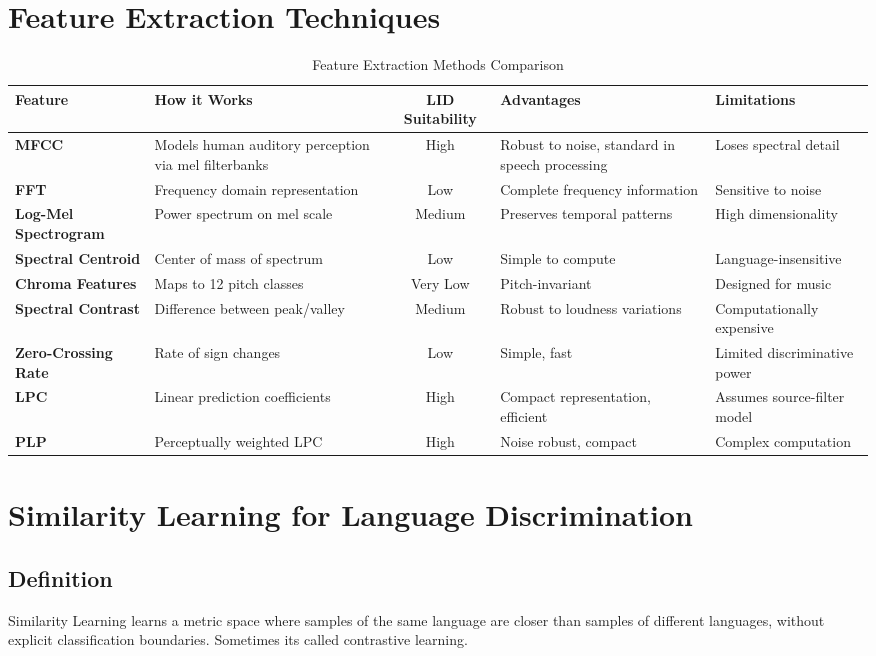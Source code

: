 \documentclass[12pt,a4paper]{article}
\begin{document}
	\section{Feature Extraction Techniques}
	
	\begin{table}[H]
		\centering
		\caption{Feature Extraction Methods Comparison}
		\begin{tabularx}{\textwidth}{lXcXX}
			\toprule
			\textbf{Feature} & \textbf{How it Works} & \textbf{LID Suitability} & \textbf{Advantages} & \textbf{Limitations} \\
			\midrule
			\textbf{MFCC} & Models human auditory perception via mel filterbanks & High & Robust to noise, standard in speech processing & Loses spectral detail \\
			\textbf{FFT} & Frequency domain representation & Low & Complete frequency information & Sensitive to noise \\
			\textbf{Log-Mel Spectrogram} & Power spectrum on mel scale & Medium & Preserves temporal patterns & High dimensionality \\
			\textbf{Spectral Centroid} & Center of mass of spectrum & Low & Simple to compute & Language-insensitive \\
			\textbf{Chroma Features} & Maps to 12 pitch classes & Very Low & Pitch-invariant & Designed for music \\
			\textbf{Spectral Contrast} & Difference between peak/valley & Medium & Robust to loudness variations & Computationally expensive \\
			\textbf{Zero-Crossing Rate} & Rate of sign changes & Low & Simple, fast & Limited discriminative power \\
			\textbf{LPC} & Linear prediction coefficients & High & Compact representation, efficient & Assumes source-filter model \\
			\textbf{PLP} & Perceptually weighted LPC & High & Noise robust, compact & Complex computation \\
			\bottomrule
		\end{tabularx}
	\end{table}
	
	
	\section{Similarity Learning for Language Discrimination}
	
	\subsection{Definition}
	Similarity Learning learns a metric space where samples of the same language are closer than samples of different languages, without explicit classification boundaries. Sometimes its called contrastive learning.
	
\end{document}
